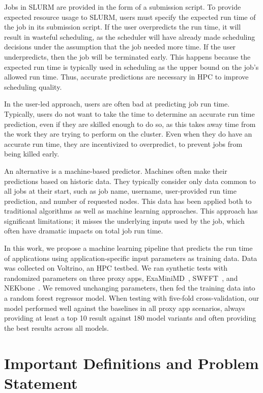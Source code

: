 \documentclass[conference, 10pt, onecolumn, draftclsnofoot]{IEEEtran}
\begin{document}
Jobs in SLURM are provided in the form of a submission script.
To provide expected resource usage to SLURM, users must specify the expected run time of the job in its submission script.
If the user overpredicts the run time, it will result in wasteful scheduling, as the scheduler will have already made scheduling decisions under the assumption that the job needed more time. 
If the user underpredicts, then the job will be terminated early.
This happens because the expected run time is typically used in scheduling as the upper bound on the job's allowed run time.
Thus, accurate predictions are necessary in HPC to improve scheduling quality.

In the user-led approach, users are often bad at predicting job run time.
Typically, users do not want to take the time to determine an accurate run time prediction, even if they are skilled enough to do so, as this takes away time from the work they are trying to perform on the cluster.
Even when they do have an accurate run time, they are incentivized to overpredict, to prevent jobs from being killed early.

An alternative is a machine-based predictor.
Machines often make their predictions based on historic data.
They typically consider only data common to all jobs at their start, such as job name, username, user-provided run time prediction, and number of requested nodes.
This data has been applied both to traditional algorithms as well as machine learning approaches.
This approach has significant limitations; it misses the underlying inputs used by the job, which often have dramatic impacts on total job run time.

In this work, we propose a machine learning pipeline that predicts the run time of applications using application-specific input parameters as training data.
Data was collected on Voltrino, an HPC testbed.
We ran synthetic tests with randomized parameters on three proxy apps, ExaMiniMD~\cite{ExaMiniMD}, SWFFT~\cite{SWFFT}, and NEKbone~\cite{NEKbone}.
We removed unchanging parameters, then fed the training data into a random forest regressor model.
When testing with five-fold cross-validation, our model performed well against the baselines in all proxy app scenarios, always providing at least a top 10 result against 180 model variants and often providing the best results across all models.

\section{Important Definitions and Problem Statement}
\end{document}
